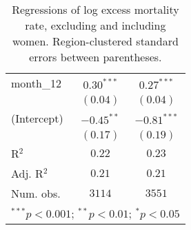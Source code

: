 \begin{table}[h!]
\begin{center}
\begin{small}
\begin{tabular}{l c c}
month\_12      & $0.30^{***}$  & $0.27^{***}$  \\
               & $(0.04)$      & $(0.04)$      \\
(Intercept)    & $-0.45^{**}$  & $-0.81^{***}$ \\
               & $(0.17)$      & $(0.19)$      \\
\hline
R$^2$          & $0.22$        & $0.23$        \\
Adj. R$^2$     & $0.21$        & $0.21$        \\
Num. obs.      & $3114$        & $3551$        \\
\hline
\multicolumn{3}{l}{\tiny{$^{***}p<0.001$; $^{**}p<0.01$; $^{*}p<0.05$}}
\end{tabular}
\end{small}
\caption{Regressions of log excess mortality rate, excluding and including women. Region-clustered standard errors between parentheses.}
\label{tab:femmodels}
\end{center}
\end{table}
